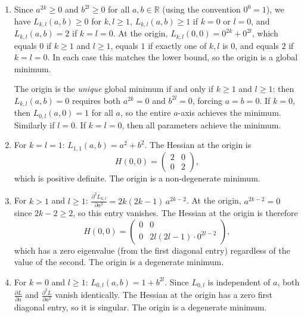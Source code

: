 \documentclass[11pt]{article}
\newcommand{\R}{\mathbb{R}}
\begin{document}
\begin{solution}
\begin{enumerate}
    \item
        Since $a^{2k} \geq 0$ and $b^{2l} \geq 0$ for all $a, b \in \R$
        (using the convention $0^0 = 1$), we have $L_{k,l}(a,b) \geq 0$ for
        $k, l \geq 1$, $L_{k,l}(a,b) \geq 1$ if $k = 0$ or $l = 0$, and
        $L_{k,l}(a,b) = 2$ if $k = l = 0$.
        At the origin,
        $L_{k,l}(0,0) = 0^{2k} + 0^{2l}$,
        which equals $0$ if $k \geq 1$ and $l \geq 1$, equals $1$ if exactly
        one of $k, l$ is $0$, and equals $2$ if $k = l = 0$.
        In each case this matches the lower bound, so the origin is a global
        minimum.

        The origin is the \emph{unique} global minimum if and only if
        $k \geq 1$ and $l \geq 1$: then $L_{k,l}(a,b) = 0$ requires both
        $a^{2k} = 0$ and $b^{2l} = 0$, forcing $a = b = 0$.
        If $k = 0$, then $L_{0,l}(a,0) = 1$ for all $a$, so the entire
        $a$-axis achieves the minimum. Similarly if $l = 0$. If $k = l = 0$,
        then all parameters achieve the minimum.

    \item
        For $k = l = 1$: $L_{1,1}(a,b) = a^2 + b^2$. The Hessian at the
        origin is
        \begin{equation*}
            H(0,0) = \begin{pmatrix} 2 & 0 \\ 0 & 2 \end{pmatrix},
        \end{equation*}
        which is positive definite. The origin is a non-degenerate minimum.

    \item
        For $k > 1$ and $l \geq 1$:
        $\frac{\partial^2 L_{k,l}}{\partial a^2}
        = 2k(2k{-}1)\, a^{2k-2}$.
        At the origin, $a^{2k-2} = 0$ since $2k - 2 \geq 2$, so this entry
        vanishes. The Hessian at the origin is therefore
        \begin{equation*}
            H(0,0) = \begin{pmatrix}
                0 & 0 \\
                0 & 2l(2l{-}1) \cdot 0^{2l-2}
            \end{pmatrix},
        \end{equation*}
        which has a zero eigenvalue (from the first diagonal entry) regardless
        of the value of the second. The origin is a degenerate minimum.

    \item
        For $k = 0$ and $l \geq 1$: $L_{0,l}(a,b) = 1 + b^{2l}$.
        Since $L_{0,l}$ is independent of $a$, both $\frac{\partial L}{\partial
        a}$ and $\frac{\partial^2 L}{\partial a^2}$ vanish identically. The
        Hessian at the origin has a zero first diagonal entry, so it is
        singular. The origin is a degenerate minimum. \qedhere
\end{enumerate}
\end{solution}
\end{document}
